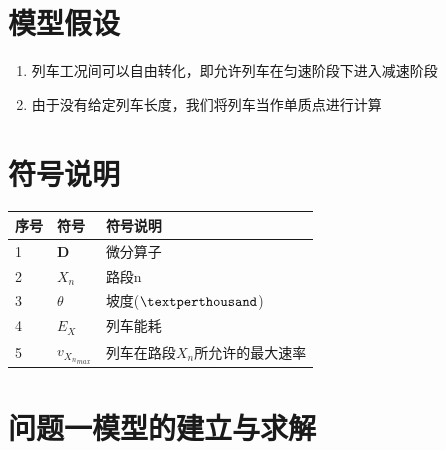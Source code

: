 \documentclass[12pt,a4paper]{nmmcm}
\newcommand{\headcol}{\rowcolor{tableheadcolor}}
\begin{document}
\section{模型假设}
\begin{enumerate}
  \item 列车工况间可以自由转化，即允许列车在匀速阶段下进入减速阶段
  \item 由于没有给定列车长度，我们将列车当作单质点进行计算
\end{enumerate}

\section{符号说明}
\begin{table}[h!]
  \centering
  \small
  \begin{tabular}{p{60pt}<{\centering}|p{60pt}<{\centering}p{180pt}<{\raggedright}}
   \hline
   \headcol 序号 & 符号 & 符号说明 \\
   \hline
    1 & $\mathbf{D}$ & 微分算子 \\
    2 & $X_n$ & 路段n \\
    3 & $\theta$ & 坡度($\textperthousand$) \\
    4 & $E_X$ & 列车能耗 \\
    5 & $v_{{X_n}_{max}}$ & 列车在路段$X_n$所允许的最大速率 \\
    \hline
  \end{tabular}
  \label{symbol}
\end{table}
\clearpage
\section{问题一模型的建立与求解}




\end{document}
